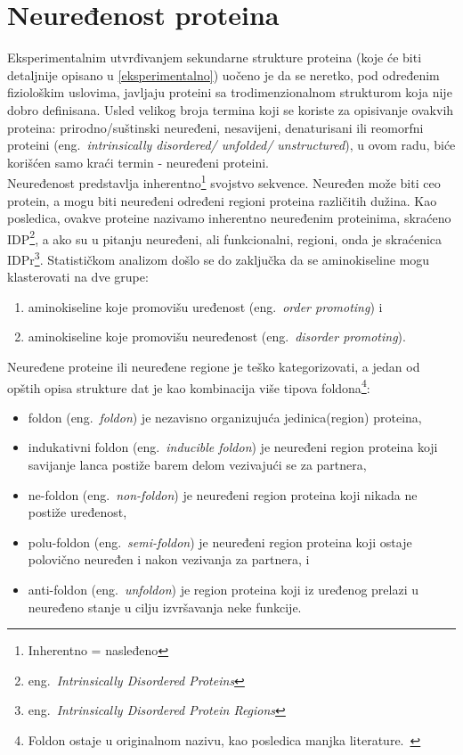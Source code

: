 \section{Neuređenost proteina}

Eksperimentalnim utvrđivanjem sekundarne strukture proteina (koje će biti detaljnije opisano u \ref{eksperimentalno}) uočeno je da se neretko, pod određenim fiziološkim uslovima, javljaju proteini sa trodimenzionalnom strukturom koja nije dobro definisana. Usled velikog broja termina koji se koriste za opisivanje ovakvih proteina: prirodno/suštinski neuređeni, nesavijeni, denaturisani ili reomorfni proteini (eng.~{\em intrinsically disordered/ unfolded/ unstructured}), u ovom radu, biće korišćen samo kraći termin - neuređeni proteini. \\
Neuređenost predstavlja inherentno\footnote{Inherentno = nasleđeno} svojstvo sekvence. Neuređen može biti ceo protein, a mogu biti neuređeni određeni regioni proteina različitih dužina. Kao posledica, ovakve proteine nazivamo inherentno neuređenim proteinima, skraćeno IDP\footnote{eng.~{\em Intrinsically Disordered Proteins}}, a ako su u pitanju neuređeni, ali funkcionalni, regioni, onda je skraćenica IDPr\footnote{eng.~{\em Intrinsically Disordered Protein Regions}}. Statističkom analizom došlo se do zaključka da se aminokiseline mogu klasterovati na dve grupe: 
\begin{enumerate}
\item aminokiseline koje promovišu uređenost (eng.~{\em order promoting}) i
\item aminokiseline koje promovišu neuređenost (eng.~{\em disorder promoting}).
\end{enumerate}
Neuređene proteine ili neuređene regione je teško kategorizovati, a jedan od opštih opisa strukture dat je kao kombinacija više tipova foldona\footnote{Foldon ostaje u originalnom nazivu, kao posledica manjka literature.~\cite{Vinterhalter}}:
\begin{itemize}
\item foldon (eng.~{\em foldon}) je nezavisno organizujuća jedinica(region) proteina,
\item indukativni foldon (eng.~{\em inducible foldon}) je neuređeni region proteina koji savijanje lanca postiže barem delom vezivajući se za partnera,
\item ne-foldon (eng.~{\em non-foldon}) je neuređeni region proteina koji nikada ne postiže uređenost,
\item polu-foldon (eng.~{\em semi-foldon}) je neuređeni region proteina koji ostaje polovično neuređen i nakon vezivanja za partnera, i 
\item anti-foldon (eng.~{\em unfoldon}) je region proteina koji iz uređenog prelazi u neuređeno stanje u cilju izvršavanja neke funkcije.
\end{itemize}

